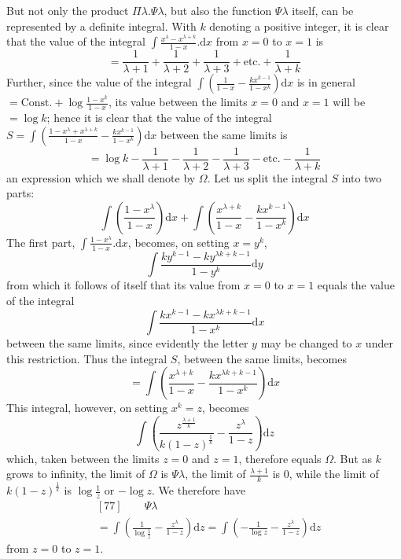 But not only the product $\Pi\lambda.\Psi\lambda$, but also the function $\Psi\lambda$ itself, can be represented by a definite integral. With $k$ denoting a positive integer, it is clear that the value of the integral $\int\frac{x^\lambda-x^{\lambda+k}}{1-x}.\mathrm{d}x$ from $x=0$ to $x=1$ is
\[
=\frac{1}{\lambda+1}+\frac{1}{\lambda+2}+\frac{1}{\lambda+3}+\text{etc.}+\frac{1}{\lambda+k}
\]
Further, since the value of the integral $\int\left(\frac{1}{1-x}-\frac{kx^{k-1}}{1-x^k}\right)\mathrm{d}x$ is in general $=\mathrm{Const.}+\log\frac{1-x^k}{1-x}$, its value between the limits $x=0$ and $x=1$ will be $=\log k$; hence it is clear that the value of the integral $S=\int\left(\frac{1-x^\lambda+x^{\lambda+k}}{1-x}-\frac{kx^{k-1}}{1-x^k}\right)\mathrm{d}x$ between the same limits is
\[
=\log k-\frac{1}{\lambda+1}-\frac{1}{\lambda+2}-\frac{1}{\lambda+3}-\text{etc.}-\frac{1}{\lambda+k}
\]
an expression which we shall denote by $\Omega$. Let us split the integral $S$ into two parts:
\[
\int\left(\frac{1-x^\lambda}{1-x}\right)\mathrm{d}x+\int\left(\frac{x^{\lambda+k}}{1-x}-\frac{kx^{k-1}}{1-x^k}\right)\mathrm{d}x
\]
The first part, $\int\frac{1-x^\lambda}{1-x}.\mathrm{d}x$, becomes, on setting $x=y^k$,
\[
\int\frac{ky^{k-1}-ky^{\lambda k+k-1}}{1-y^k}\mathrm{d}y
\]
from which it follows of itself that its value from $x=0$ to $x=1$ equals the value of the integral
\[
\int\frac{kx^{k-1}-kx^{\lambda k+k-1}}{1-x^k}\mathrm{d}x
\]
between the same limits, since evidently the letter $y$ may be changed to $x$ under this restriction. Thus the integral $S$, between the same limits, becomes
\[
=\int\left(\frac{x^{\lambda+k}}{1-x}-\frac{kx^{\lambda k+k-1}}{1-x^k}\right)\mathrm{d}x
\]
This integral, however, on setting $x^k=z$, becomes
\[
\int\left(\frac{z^{\frac{\lambda+1}{k}}}{k(1-z)^{\frac{1}{k}}}-\frac{z^\lambda}{1-z}\right)\mathrm{d}z
\]
which, taken between the limits $z=0$ and $z=1$, therefore equals $\Omega$. But as $k$ grows to infinity, the limit of $\Omega$ is $\Psi\lambda$, the limit of $\frac{\lambda+1}{k}$ is $0$, while the limit of $k(1-z)^{\frac{1}{k}}$ is $\log\frac{1}{z}$ or $-\log z$. We therefore have
\[
\begin{aligned}
&[77]\qquad \Psi\lambda\\[4pt]
&=\int\left(\frac{1}{\log\frac{1}{z}}-\frac{z^\lambda}{1-z}\right)\mathrm{d}z
=\int\left(-\frac{1}{\log z}-\frac{z^\lambda}{1-z}\right)\mathrm{d}z
\end{aligned}
\]
from $z=0$ to $z=1$.

